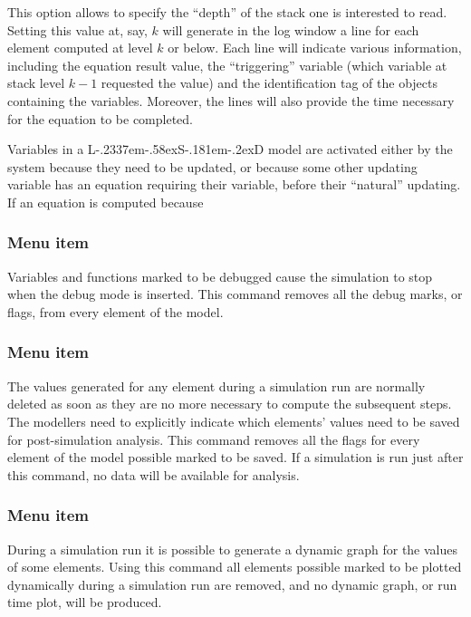 \documentclass [11pt,a4paper] {book}
\def\LsD{{L\kern-.2337em\lower-.58ex\hbox{S}\kern-.181em\lower-.2ex\hbox{D}}\xspace}
\begin{document}
This option allows to specify the ``depth'' of the stack one is interested to read. Setting this value at, say, $k$ will generate in the log window a line for each element computed at level $k$ or below. Each line will indicate various information, including the equation result value, the ``triggering'' variable (which variable at stack level $k-1$ requested the value) and the identification tag of the objects containing the variables. Moreover, the lines will also provide the time necessary for the equation to be completed.

Variables in a \LsD model are activated either by the system because they need to be updated, or because some other updating variable has an equation requiring their variable, before their ``natural'' updating. If an equation is computed because

\subsubsection{Menu item  }
Variables and functions marked to be debugged cause the simulation to stop when the debug mode is inserted. This command removes all the debug marks, or flags, from every element of the model.

\subsubsection{Menu item  }

The values generated for any element during a simulation run are normally deleted as soon as they are no more necessary to compute the subsequent steps. The modellers need to explicitly indicate which elements' values need to be saved for post-simulation analysis. This command removes all the flags for every element of the model possible marked to be saved. If a simulation is run just after this command, no data will be available for analysis.

\subsubsection{Menu item  }

During a simulation run it is possible to generate a dynamic graph for the values of some elements. Using this command all elements possible marked to be plotted dynamically during a simulation run are removed, and no dynamic graph, or run time plot, will be produced.
\end{document}
